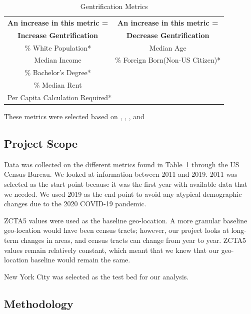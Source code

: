 \documentclass[conference]{IEEEtran}
\begin{document}
\begin{table}[htbp]
\caption{Gentrification Metrics}
\begin{center}
\begin{tabular}{cc}
\hline\hline
\textbf{An increase in this metric =} & \textbf{An increase in this metric =} \\
\textbf{Increase Gentrification} & \textbf{Decrease Gentrification} \\
\hline
\% White Population* & Median Age                                   \\
Median Income        & \% Foreign Born(Non-US Citizen)*              \\
\% Bachelor's Degree* & \\
\% Median Rent &\\
\hline\hline
\multicolumn{2}{l}{Per Capita Calculation Required*}
\end{tabular}
\label{gen_metrics}
\end{center}
\end{table}

These metrics were selected based on \cite{b1}, \cite{b2}, \cite{b3}, and \cite{b4}

\subsection{Project Scope}
Data was collected on the different metrics found in Table~\ref{gen_metrics} through the US Census Bureau. We looked at information between 2011 and 2019. 2011 was selected as the start point because it was the first year with available data that we needed. We used 2019 as the end point to avoid any atypical demographic changes due to the 2020 COVID-19 pandemic.

ZCTA5 values were used as the baseline geo-location. A more granular baseline geo-location would have been census tracts; however, our project looks at long-term changes in areas, and census tracts can change from year to year. ZCTA5 values remain relatively constant, which meant that we knew that our geo-location baseline would remain the same.

New York City was selected as the test bed for our analysis.

\subsection{Methodology}
\end{document}
